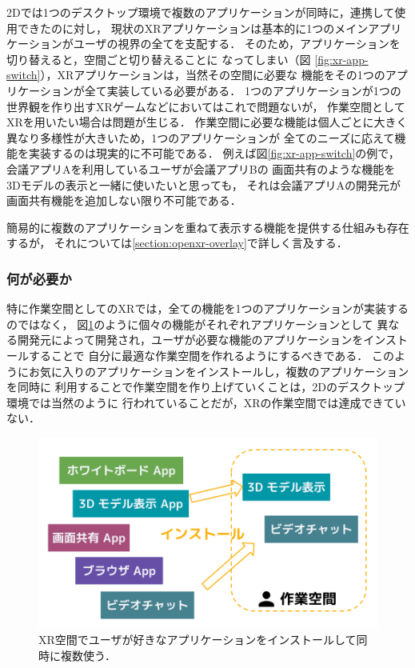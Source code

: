 2Dでは1つのデスクトップ環境で複数のアプリケーションが同時に，連携して使用できたのに対し，
現状のXRアプリケーションは基本的に1つのメインアプリケーションがユーザの視界の全てを支配する．
そのため，アプリケーションを切り替えると，空間ごと切り替えることに
なってしまい（図 \ref{fig:xr-app-switch}），XRアプリケーションは，当然その空間に必要な
機能をその1つのアプリケーションが全て実装している必要がある．
1つのアプリケーションが1つの世界観を作り出すXRゲームなどにおいてはこれで問題ないが，
作業空間としてXRを用いたい場合は問題が生じる．
作業空間に必要な機能は個人ごとに大きく異なり多様性が大きいため，1つのアプリケーションが
全てのニーズに応えて機能を実装するのは現実的に不可能である．
例えば図\ref{fig:xr-app-switch}の例で，会議アプリAを利用しているユーザが会議アプリBの
画面共有のような機能を3Dモデルの表示と一緒に使いたいと思っても，
それは会議アプリAの開発元が画面共有機能を追加しない限り不可能である．

簡易的に複数のアプリケーションを重ねて表示する機能を提供する仕組みも存在するが，
それについては\ref{section:openxr-overlay}で詳しく言及する．

\subsubsection{何が必要か}

特に作業空間としてのXRでは，全ての機能を1つのアプリケーションが実装するのではなく，
図\ref{fig:xr-app-install}のように個々の機能がそれぞれアプリケーションとして
異なる開発元によって開発され，ユーザが必要な機能のアプリケーションをインストールすることで
自分に最適な作業空間を作れるようにするべきである．
このようにお気に入りのアプリケーションをインストールし，複数のアプリケーションを同時に
利用することで作業空間を作り上げていくことは，2Dのデスクトップ環境では当然のように
行われていることだが，XRの作業空間では達成できていない．

\begin{figure}[htbp]
  \begin{minipage}[t]{0.50\linewidth}
    \centering
    \includegraphics[keepaspectratio, width=\linewidth]{fig/xr-app-install.png}
    \caption{XR空間でユーザが好きなアプリケーションをインストールして同時に複数使う．}
    \label{fig:xr-app-install}
  \end{minipage}
\end{figure}
